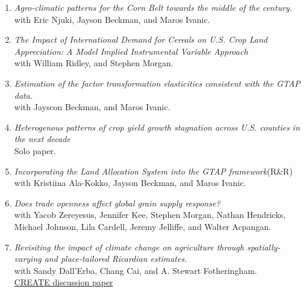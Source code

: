 \documentclass[11pt]{article}
\makeatletter
\newlength{\bibhang}
\newlength{\bibsep}
 {\@listi \global\bibsep\itemsep \global\advance\bibsep by\parsep}
\newenvironment{bibsection}%
        {\begin{enumerate}{}{%
       \setlength{\leftmargin}{\bibhang}%
       \setlength{\itemindent}{-\leftmargin}%
       \setlength{\itemsep}{\bibsep}%
       \setlength{\parsep}{\z@}%
        \setlength{\partopsep}{0pt}%
        \setlength{\topsep}{0pt}}}
        {\end{enumerate}\vspace{-.6\baselineskip}}
\makeatother
\begin{document}
\begin{bibsection}
	
	\item {\textit{Agro-climatic patterns for the Corn Belt towards the middle of the century.}} 
	\\with Eric Njuki, Jayson Beckman, and Maros Ivanic.
	
	\item {\textit{The Impact of International Demand for Cereals on U.S. Crop Land Appreciation: A Model Implied Instrumental Variable Approach}} 
	\\with William Ridley, and Stephen Morgan.
	
	\item {\textit{Estimation of the factor transformation elasticities consistent with the GTAP data.}} 
	\\with Jayscon Beckman, and Maros Ivanic.
	
     \item {\textit{Heterogenous patterns of crop yield growth stagnation across U.S. counties in the next decade}}
     \\ Solo paper.
       
       \item {\textit{Incorporating the Land Allocation System  into the GTAP framework}}(R\&R) 
       \\with Kristiina Ala-Kokko, Jayson Beckman, and Maros Ivanic.
		
		\item {\textit{Does trade openness affect global grain supply response?}}
		\\with Yacob Zereyesus, Jennifer Kee, Stephen Morgan, Nathan Hendricks, Michael Johnson, Lila Cardell, Jeremy Jelliffe, and Walter Acpangan.
		
		
		 \item \textit{Revisiting the impact of climate change on agriculture through spatially-varying and place-tailored Ricardian estimates.}
		\\ with Sandy Dall'Erba, Chang Cai, and A. Stewart Fotheringham.
		\\ \href{https://create.ace.illinois.edu/files/2022/02/CREATE_WP22-02.pdf}{CREATE discussion paper}
\end{bibsection}
\end{document}
